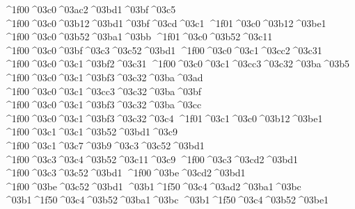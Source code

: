 {^^^^1f00^^^^03c0^^^^03ac2^^^^03bd1^^^^03bf^^^^03c5 		%
^^^^1f00^^^^03c0^^^^03b12^^^^03bd1^^^^03bf^^^^03cd^^^^03c1
^^^^1f01^^^^03c0^^^^03b12^^^^03be1       		%
^^^^1f00^^^^03c0^^^^03b52^^^^03ba1^^^^03bb 		%
^^^^1f01^^^^03c0^^^^03b52^^^^03c11      		%
^^^^1f00^^^^03c0^^^^03bf^^^^03c3^^^^03c52^^^^03bd1 		%
^^^^1f00^^^^03c0^^^^03c1^^^^03cc2^^^^03c31 		%
^^^^1f00^^^^03c0^^^^03c1^^^^03bf2^^^^03c31
	^^^^1f00^^^^03c0^^^^03c1^^^^03cc3^^^^03c32^^^^03ba^^^^03b5 		%
	^^^^1f00^^^^03c0^^^^03c1^^^^03bf3^^^^03c32^^^^03ba^^^^03ad
	^^^^1f00^^^^03c0^^^^03c1^^^^03cc3^^^^03c32^^^^03ba^^^^03bf 		%
	^^^^1f00^^^^03c0^^^^03c1^^^^03bf3^^^^03c32^^^^03ba^^^^03cc
	^^^^1f00^^^^03c0^^^^03c1^^^^03bf3^^^^03c32^^^^03c4 		%
^^^^1f01^^^^03c1^^^^03c0^^^^03b12^^^^03be1 		%
^^^^1f00^^^^03c1^^^^03c1^^^^03b52^^^^03bd1^^^^03c9 		%
^^^^1f00^^^^03c1^^^^03c7^^^^03b9^^^^03c3^^^^03c52^^^^03bd1 		%
^^^^1f00^^^^03c3^^^^03c4^^^^03b52^^^^03c11^^^^03c9    		%
^^^^1f00^^^^03c3^^^^03cd2^^^^03bd1     		%
^^^^1f00^^^^03c3^^^^03c52^^^^03bd1
^^^^1f00^^^^03be^^^^03cd2^^^^03bd1  		%
^^^^1f00^^^^03be^^^^03c52^^^^03bd1 
^^^^03b1^^^^1f50^^^^03c4^^^^03ad2^^^^03ba1^^^^03bc 		%
^^^^03b1^^^^1f50^^^^03c4^^^^03b52^^^^03ba1^^^^03bc
^^^^03b1^^^^1f50^^^^03c4^^^^03b52^^^^03be1   		%
}
